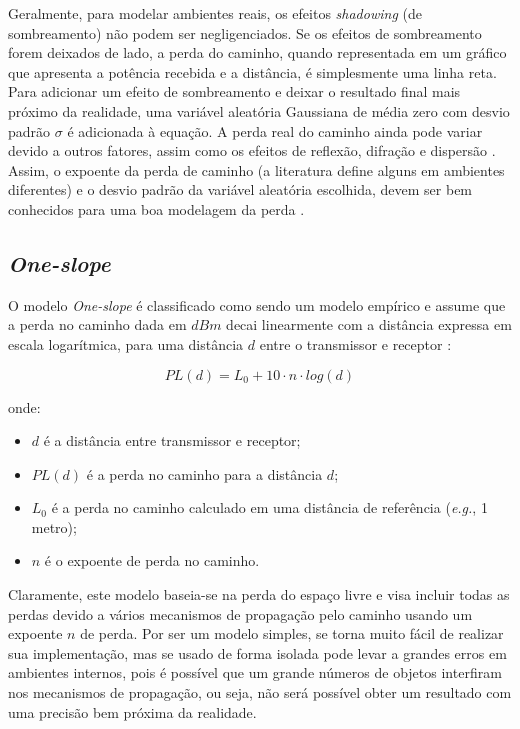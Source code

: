 \documentclass[
	12pt,				%
	twoside,			%
	a4paper,			%
	english,			%
	french,				%
	spanish,			%
	brazil				%
	]{abntex2}
\begin{document}
Geralmente, para modelar ambientes reais, os efeitos \emph{shadowing}
(de sombreamento) não podem ser negligenciados. Se os efeitos de
sombreamento forem deixados de lado, a perda do caminho, quando
representada em um gráfico que apresenta a potência recebida e a
distância, é simplesmente uma linha reta. Para adicionar um efeito de
sombreamento e deixar o resultado final mais próximo da realidade, uma
variável aleatória Gaussiana de média zero com desvio padrão \(\sigma\)
é adicionada à equação. A perda real do caminho ainda pode variar devido
a outros fatores, assim como os efeitos de reflexão, difração e
dispersão \cite{RAPPAPORT}. Assim, o expoente da perda de caminho (a
literatura define alguns em ambientes diferentes) e o desvio padrão da
variável aleatória escolhida, devem ser bem conhecidos para uma boa
modelagem da perda \cite{LUO}.

\subsection{\texorpdfstring{\emph{One-slope}}{One-slope}}\label{sec:one_slope}

O modelo \emph{One-slope} é classificado como sendo um modelo empírico e
assume que a perda no caminho dada em \(dBm\) decai linearmente com a
distância expressa em escala logarítmica, para uma distância \(d\) entre
o transmissor e receptor \cite{LUO}:

\begin{equation}
PL(d) = L_{0} + 10 \cdot n \cdot log(d)
\end{equation}

onde:

\begin{itemize}
\item
  \(d\) é a distância entre transmissor e receptor;
\item
  \(PL(d)\) é a perda no caminho para a distância \(d\);
\item
  \(L_{0}\) é a perda no caminho calculado em uma distância de
  referência (\emph{e.g.}, 1 metro);
\item
  \(n\) é o expoente de perda no caminho.
\end{itemize}

Claramente, este modelo baseia-se na perda do espaço livre e visa
incluir todas as perdas devido a vários mecanismos de propagação pelo
caminho usando um expoente \(n\) de perda. Por ser um modelo simples, se
torna muito fácil de realizar sua implementação, mas se usado de forma
isolada pode levar a grandes erros em ambientes internos, pois é
possível que um grande números de objetos interfiram nos mecanismos de
propagação, ou seja, não será possível obter um resultado com uma
precisão bem próxima da realidade.
\end{document}
